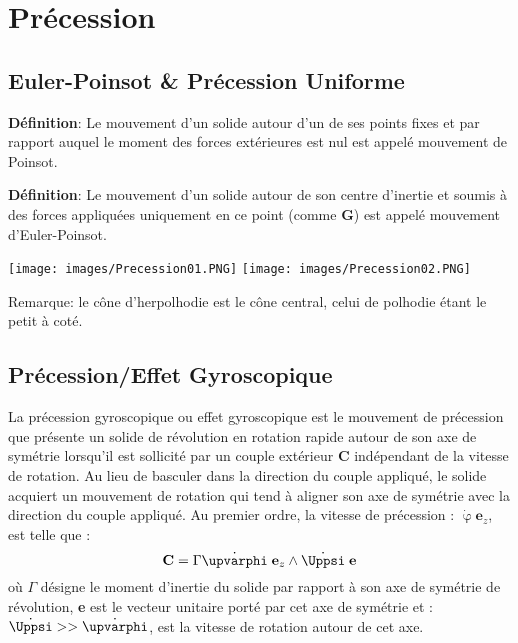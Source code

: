 \documentclass[a4paper]{article}
\begin{document}
\section{Précession}





\subsection{Euler-Poinsot \& Précession Uniforme}





\textbf{Définition}: Le mouvement d'un solide autour d'un de ses points fixes et par rapport auquel le moment des forces extérieures est nul est appelé mouvement de Poinsot.

\textbf{Définition}: Le mouvement d'un solide autour de son centre d'inertie et soumis à des forces appliquées uniquement en ce point (comme \textbf{G}) est appelé mouvement d'Euler-Poinsot.
\begin{center}
\texttt{[image: images/Precession01.PNG]}
\texttt{[image: images/Precession02.PNG]}
\end{center}
Remarque: le cône d'herpolhodie est le cône central, celui de polhodie étant le petit à coté.





\subsection{Précession/Effet Gyroscopique}





La précession gyroscopique ou effet gyroscopique est le mouvement de précession que présente un solide de révolution en rotation rapide autour de son axe de symétrie lorsqu’il est sollicité par un couple extérieur \textbf{C} indépendant de la vitesse de rotation. Au lieu de basculer dans la direction du couple appliqué, le solide acquiert un mouvement de rotation qui tend à aligner son axe de symétrie avec la direction du couple appliqué. Au premier ordre, la vitesse de précession : $ \dot{\upvarphi} \textbf{e}_z $, est telle que : 
\[ \textbf{C} = \Gamma \dot{\upvarphi} \; \textbf{e}_z \wedge \dot{\Uppsi} \; \textbf{e} \]
où $ \Gamma $ désigne le moment d’inertie du solide par rapport à son axe de symétrie de révolution, \textbf{e} est le vecteur unitaire porté par cet axe de symétrie et : $ \dot{\Uppsi} >> \dot{\upvarphi} $, est la vitesse de rotation autour de cet axe.
\end{document}

